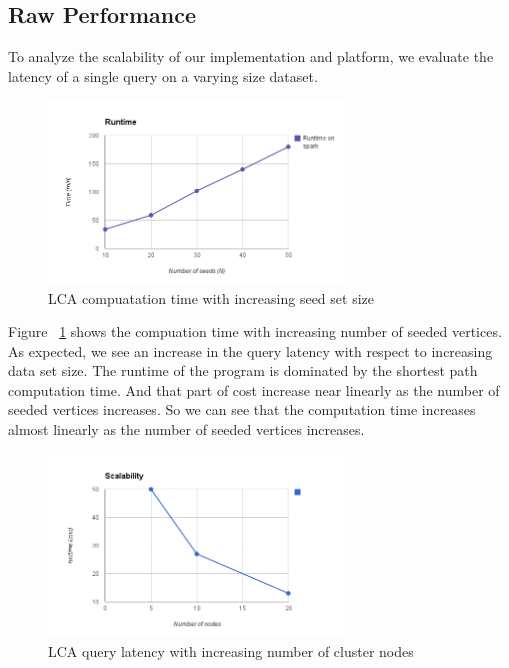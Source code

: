 \documentclass{article}
\begin{document}
\subsection{Raw Performance}

To analyze the scalability of our implementation and platform, we evaluate the latency of a single query on a varying size dataset.

\begin{figure}
\centering
\includegraphics[width=0.7\textwidth]{runtime.png}
\caption{LCA compuatation time with increasing seed set size}
\label{latency_scaling}
\end{figure}

Figure ~\ref{latency_scaling} shows the compuation time with 
increasing number of seeded vertices.
As expected, we see an increase in the query latency with respect to 
increasing data set size. The runtime of the program is dominated by the 
shortest path computation time. And that part of cost increase near linearly 
as the number of seeded vertices increases. So we can see that the computation 
time increases almost linearly as the number of seeded vertices increases.


\begin{figure}
\centering


\includegraphics[width=0.7\textwidth]{scalability.png}

\caption{LCA query latency with increasing number of cluster nodes}
\label{node_scaling}
\end{figure}
\end{document}
